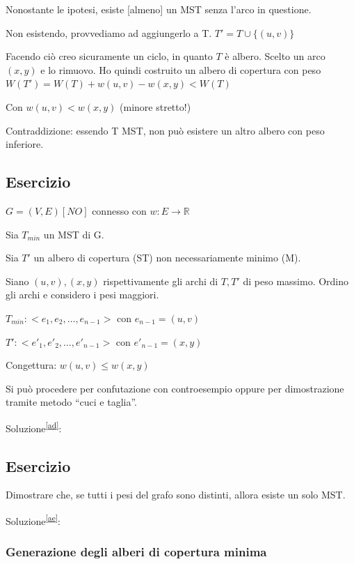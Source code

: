 \documentclass[tikz]{article}
\begin{document}
{{{Nonostante le ipotesi, esiste {[}almeno{]} un MST senza l'arco in
questione.}

{Non esistendo, provvediamo ad aggiungerlo a T. $T' = T \cup \{(u,v)\}$}

{Facendo ciò creo sicuramente un ciclo, in quanto $T$ è albero. Scelto un arco $(x,y)$ e lo rimuovo. Ho quindi costruito un albero di copertura con peso $W(T') = W(T) + w(u,v) - w(x,y) < W(T)$}

{Con $w(u,v) < w(x,y)$ (minore stretto!)}

{Contraddizione}{: essendo T MST, non può esistere un altro albero con peso inferiore.}

\subsection{Esercizio}

$G=(V,E) [NO]$ connesso con $w:E \rightarrow \mathbb{R}$

{Sia $T_{min}$ un MST di G.}

{Sia $T'$ un albero di copertura (ST) non necessariamente minimo (M).}

{Siano $(u,v),(x,y)$ rispettivamente gli archi di $T,T'$ di peso massimo. Ordino gli archi e considero i pesi maggiori.}

$T_{min}: <e_1,e_2,\ldots,e_{n-1}>$ con $e_{n-1} = (u,v)$

$T': <e'_1,e'_2,\ldots,e'_{n-1}>$ con $e'_{n-1} = (x,y)$

{Congettura: $w(u,v) \leq w(x,y)$}

{Si può procedere per confutazione con controesempio oppure per dimostrazione tramite metodo ``cuci e taglia''.}

{Soluzione}\textsuperscript{\protect\hyperlink{cmnt30}{{[}ad{]}}}{:}

\subsection{Esercizio}

{Dimostrare che, se tutti i pesi del grafo sono distinti, allora esiste un solo MST.}

{Soluzione}\textsuperscript{\protect\hyperlink{cmnt31}{{[}ae{]}}}{:}

\subsubsection{Generazione degli alberi di copertura minima}

}}
\end{document}
